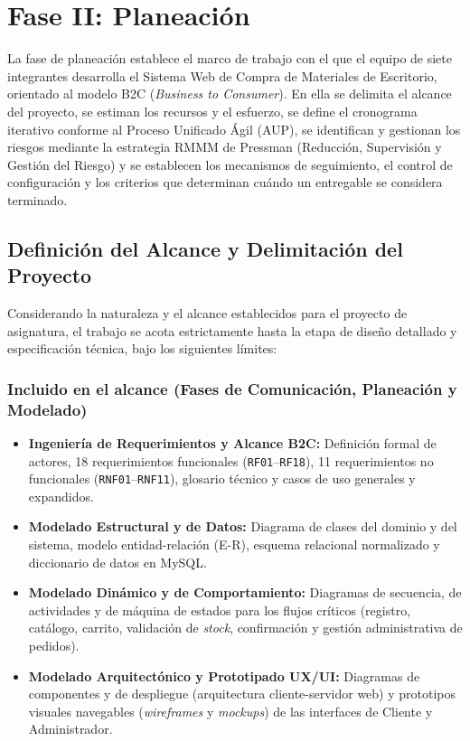 \section{Fase II: Planeación}

La fase de planeación establece el marco de trabajo con el que el equipo de siete integrantes desarrolla el Sistema Web de Compra de Materiales de Escritorio, orientado al modelo B2C (\textit{Business to Consumer}). En ella se delimita el alcance del proyecto, se estiman los recursos y el esfuerzo, se define el cronograma iterativo conforme al Proceso Unificado Ágil (AUP), se identifican y gestionan los riesgos mediante la estrategia RMMM de Pressman (Reducción, Supervisión y Gestión del Riesgo) y se establecen los mecanismos de seguimiento, el control de configuración y los criterios que determinan cuándo un entregable se considera terminado.

\subsection{Definición del Alcance y Delimitación del Proyecto}
\label{subsec:alcance_delimitacion}

Considerando la naturaleza y el alcance establecidos para el proyecto de asignatura, el trabajo se acota estrictamente hasta la etapa de diseño detallado y especificación técnica, bajo los siguientes límites:

\subsubsection*{Incluido en el alcance (Fases de Comunicación, Planeación y Modelado)}
\begin{itemize}
    \item \textbf{Ingeniería de Requerimientos y Alcance B2C:} Definición formal de actores, 18 requerimientos funcionales (\texttt{RF01}--\texttt{RF18}), 11 requerimientos no funcionales (\texttt{RNF01}--\texttt{RNF11}), glosario técnico y casos de uso generales y expandidos.
    \item \textbf{Modelado Estructural y de Datos:} Diagrama de clases del dominio y del sistema, modelo entidad-relación (E-R), esquema relacional normalizado y diccionario de datos en MySQL.
    \item \textbf{Modelado Dinámico y de Comportamiento:} Diagramas de secuencia, de actividades y de máquina de estados para los flujos críticos (registro, catálogo, carrito, validación de \textit{stock}, confirmación y gestión administrativa de pedidos).
    \item \textbf{Modelado Arquitectónico y Prototipado UX/UI:} Diagramas de componentes y de despliegue (arquitectura cliente-servidor web) y prototipos visuales navegables (\textit{wireframes} y \textit{mockups}) de las interfaces de Cliente y Administrador.
\end{itemize}

